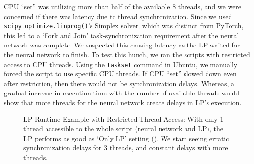CPU ``set'' was utilizing more than half of the available 8 threads, and we were concerned if there was latency due to thread synchronization. Since we used \texttt{scipy.optimize.linprog()}'s Simplex solver, which was distinct from PyTorch, this led to a `Fork and Join' task-synchronization requirement \cite[Section~2.2]{IssuesMP} after the neural network was complete. We suspected this causing latency as the LP waited for the neural network to finish. To test this hunch, we ran the scripts with restricted access to CPU threads. Using the \texttt{taskset} command in Ubuntu, we manually forced the script to use specific CPU threads. If CPU ``set'' slowed down even after restriction, then there would not be synchronization delays. Whereas, a gradual increase in execution time with the number of available threads would show that more threads for the neural network create delays in LP's execution.
\begin{figure}[!htbp]
    \centering
    \caption[LP Runtime Example with Restricted Thread Access]{LP Runtime Example with Restricted Thread Access: With only 1 thread accessible to the whole script (neural network and LP), the LP performs as good as `Only LP' setting (). We start seeing erratic synchronization delays for 3 threads, and constant delays with more threads.}
    \label{fig:LP Runtime Example with Restricted Thread Access}
\end{figure}

